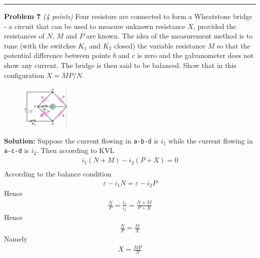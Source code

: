 \documentclass[a4paper, 11pt]{article}
\newenvironment{problem}[3][Problem]
    { \begin{mdframed}[backgroundcolor=gray!20] \textbf{#1 #2} \textit{(#3 points)} }
    {  \end{mdframed}}
\newenvironment{solution}
    {\textbf{Solution:}}
    {}
\begin{document}
\noindent\rule{7.1in}{2.8pt}

\begin{problem}{7}{4}
Four resistors are connected to form a Wheatstone bridge - a circuit that
can be used to measure unknown resistance $X$, provided the resistances of
$N$, $M$ and $P$ are known. The idea of the measurement method is to tune
(with the switches $K_1$ and $K_2$ closed) the variable resistance $M$ so that the
potential difference between points $b$ and $c$ is zero and the galvanometer
does not show any current. The bridge is then said to be balanced. Show
that in this configuration $X = MP/N$.
\end{problem}
\begin{figure}[!htbp]
	\begin{small}
		\begin{center}
			\includegraphics[width=0.2\textwidth]{hw5_p7_question.png}
		\end{center}
	\end{small}
\end{figure}

\begin{solution}
	Suppose the current flowing in \texttt{a-b-d} is $i_1$ while the current flowing
	in \texttt{a-c-d} is $i_2$. Then according to KVL
	\begin{align}
		i_1(N+M) - i_2(P+X) = 0 \\
	\end{align}
	According to the balance condition
	\begin{align}
		\varepsilon - i_1N = \varepsilon - i_2P
	\end{align}
	Hence
	\begin{align*}
		\frac{N}{P} = \frac{i_2}{i_1} = \frac{N+M}{P+X}
	\end{align*}
	Hence
	\begin{align*}
		\frac{N}{P} = \frac{M}{X}
	\end{align*}
	Namely
	\begin{align}
		X = \frac{MP}{N}
	\end{align}
\end{solution}
\end{document}
